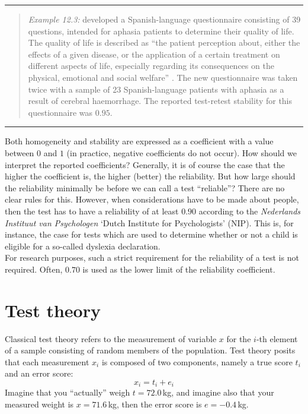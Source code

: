 \documentclass[
]{book}
\begin{document}
\begin{center}\rule{0.5\linewidth}{0.5pt}\end{center}

\begin{quote}
\emph{Example 12.3:}
\citet{Lata09} developed
a Spanish-language questionnaire consisting of 39 questions, intended
for aphasia patients to determine their quality of life. The quality of life
is described as ``the patient perception about, either the
effects of a given disease, or the application of a certain treatment on
different aspects of life, especially regarding its consequences on the
physical, emotional and social welfare'' \citep[p.379]{Lata09}. The new questionnaire
was taken twice with a sample of 23
Spanish-language patients with aphasia as a result of cerebral haemorrhage.
The reported test-retest stability for this questionnaire was
\(0.95\).
\end{quote}

\begin{center}\rule{0.5\linewidth}{0.5pt}\end{center}

Both homogeneity and stability are expressed as a
coefficient with a value between \(0\) and \(1\) (in practice, negative coefficients
do not occur). How should we interpret the reported
coefficients? Generally, it is of course the case that the higher the coefficient is,
the higher (better) the reliability. But how large should the reliability minimally be
before we can call a test ``reliable''? There are no clear rules for this.
However, when considerations have to be made about people, then the test has to
have a reliability of at least \(0.90\) according to the \emph{Nederlands
Instituut van Psychologen} `Dutch Institute for Psychologists' (NIP).
This is, for instance, the case for tests which are used to determine whether or not a child is eligible for a so-called dyslexia declaration.\\
For research purposes, such a strict requirement for the reliability of a
test is not required. Often, \(0.70\) is used as the lower limit of the
reliability coefficient.

\section{Test theory}\label{test-theory}

Classical test theory refers to the measurement of variable \(x\)
for the \(i\)-th element of a sample consisting of random members of the
population. Test theory posits that each measurement \(x_i\) is composed
of two components, namely a true score \(t_i\) and an error score:\\
\begin{equation}
  x_i = t_i + e_i
  \label{eq:obs-true-error}
\end{equation}
Imagine that you ``actually'' weigh \(t=72.0\) kg, and imagine also
that your measured weight is \(x=71.6\) kg, then the error score
is \(e=-0.4\) kg.
\end{document}
